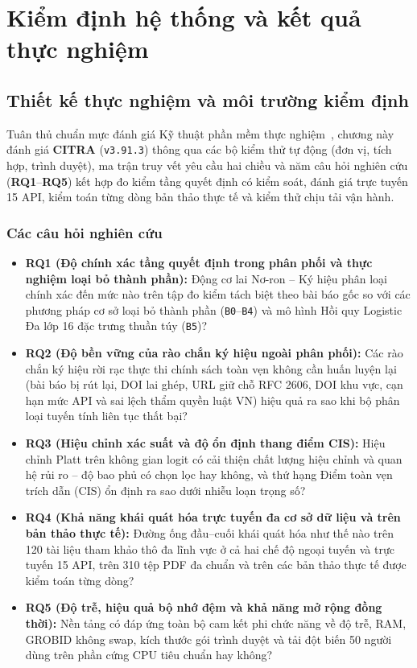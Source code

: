 \chapter{Kiểm định hệ thống và kết quả thực nghiệm}
\label{chap:results}

\section{Thiết kế thực nghiệm và môi trường kiểm định}

Tuân thủ chuẩn mực đánh giá Kỹ thuật phần mềm thực nghiệm~\cite{wohlin2012experimentation}, chương này đánh giá \textbf{CITRA} (\texttt{v3.91.3}) thông qua các bộ kiểm thử tự động (đơn vị, tích hợp, trình duyệt), ma trận truy vết yêu cầu hai chiều và năm câu hỏi nghiên cứu (\textbf{RQ1}--\textbf{RQ5}) kết hợp đo kiểm tầng quyết định có kiểm soát, đánh giá trực tuyến 15 API, kiểm toán từng dòng bản thảo thực tế và kiểm thử chịu tải vận hành.

\subsection{Các câu hỏi nghiên cứu}

\begin{itemize}
    \item \textbf{RQ1 (Độ chính xác tầng quyết định trong phân phối và thực nghiệm loại bỏ thành phần):} Động cơ lai Nơ-ron -- Ký hiệu phân loại chính xác đến mức nào trên tập đo kiểm tách biệt theo bài báo gốc so với các phương pháp cơ sở loại bỏ thành phần (\texttt{B0}--\texttt{B4}) và mô hình Hồi quy Logistic Đa lớp 16 đặc trưng thuần túy (\texttt{B5})?
    \item \textbf{RQ2 (Độ bền vững của rào chắn ký hiệu ngoài phân phối):} Các rào chắn ký hiệu rời rạc thực thi chính sách toàn vẹn không cần huấn luyện lại (bài báo bị rút lại, DOI lai ghép, URL giữ chỗ RFC 2606, DOI khu vực, cạn hạn mức API và sai lệch thẩm quyền luật VN) hiệu quả ra sao khi bộ phân loại tuyến tính liên tục thất bại?
    \item \textbf{RQ3 (Hiệu chỉnh xác suất và độ ổn định thang điểm CIS):} Hiệu chỉnh Platt trên không gian logit có cải thiện chất lượng hiệu chỉnh và quan hệ rủi ro -- độ bao phủ có chọn lọc hay không, và thứ hạng Điểm toàn vẹn trích dẫn (CIS) ổn định ra sao dưới nhiễu loạn trọng số?
    \item \textbf{RQ4 (Khả năng khái quát hóa trực tuyến đa cơ sở dữ liệu và trên bản thảo thực tế):} Đường ống đầu--cuối khái quát hóa như thế nào trên 120 tài liệu tham khảo thô đa lĩnh vực ở cả hai chế độ ngoại tuyến và trực tuyến 15 API, trên 310 tệp PDF đa chuẩn và trên các bản thảo thực tế được kiểm toán từng dòng?
    \item \textbf{RQ5 (Độ trễ, hiệu quả bộ nhớ đệm và khả năng mở rộng đồng thời):} Nền tảng có đáp ứng toàn bộ cam kết phi chức năng về độ trễ, RAM, GROBID không swap, kích thước gói trình duyệt và tải đột biến 50 người dùng trên phần cứng CPU tiêu chuẩn hay không?
\end{itemize}

